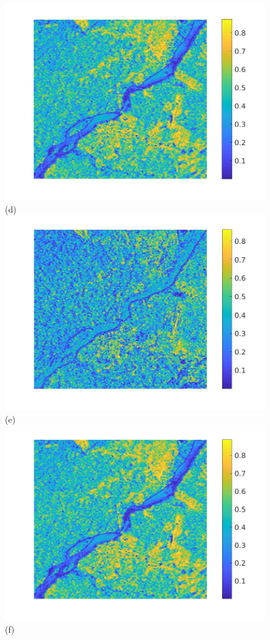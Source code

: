 \documentclass[journal]{IEEEtran}
\begin{document}
\begin{figure}[htp!]
\includegraphics[scale=.12]{../../figs/J3_VV_image_cor}(d)\\ 
\includegraphics[scale=.12]{../../figs/J3_VH_image_cor}(e)
\includegraphics[scale=.12]{../../figs/J3_euclid_image_cor}(f)


\end{figure}
\end{document}
